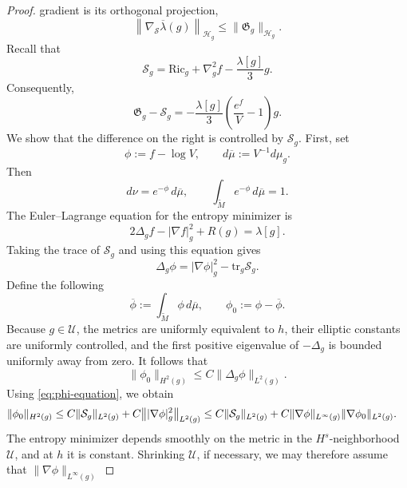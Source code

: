 \documentclass{amsart}
\newcommand{\tr}{\mbox{tr}}
\begin{document}
\begin{proof}
gradient is its orthogonal projection,
\begin{equation}
\label{eq:slice-gradient-projection}
        \left\|
        \nabla_{\mathscr S}\overline\lambda(g)
        \right\|_{\mathcal H_g}
        \leq
        \|\mathfrak G_g\|_{\mathcal H_g}.
\end{equation}
Recall that
\[
        \mathcal S_g
        =
        \text{Ric}_g+\nabla_g^2f
        -
        \frac{\lambda[g]}{3}g.
\]
Consequently,
\begin{equation}
\label{eq:gradient-defect-difference}
        \mathfrak G_g-\mathcal S_g
        =
        -\frac{\lambda[g]}{3}
        \left(
        \frac{e^f}{V}-1
        \right)g.
\end{equation}
We show that the difference on the right is controlled by
\(\mathcal S_g\). First, set
\[
        \phi:=f-\log V,
        \qquad
        d\overline\mu:=V^{-1}d\mu_g.
\]
Then
\[
        d\nu=e^{-\phi}\,d\overline\mu,
        \qquad
        \int_{\widetilde M}e^{-\phi}\,d\overline\mu=1.
\]
The Euler--Lagrange equation for the entropy minimizer is
\[
        2\Delta_gf-|\nabla f|_g^2+R(g)=\lambda[g].
\]
Taking the trace of \(\mathcal S_g\) and using this equation gives
\begin{equation}
\label{eq:phi-equation}
        \Delta_g\phi
        =
        |\nabla\phi|_g^2
        -
        \tr_g\mathcal S_g.
\end{equation}
Define the following
\[
        \overline\phi
        :=
        \int_{\widetilde M}\phi\,d\overline\mu,
        \qquad
        \phi_0:=\phi-\overline\phi.
\]
Because \(g\in\mathcal U\), the metrics are uniformly equivalent to
\(h\), their elliptic constants are uniformly controlled, and the first
positive eigenvalue of \(-\Delta_g\) is bounded uniformly away from zero.
It follows that
\[
        \|\phi_0\|_{H^2(g)}
        \leq
        C\|\Delta_g\phi\|_{L^2(g)}.
\]
Using \eqref{eq:phi-equation}, we obtain
\begin{eqnarray}
        \|\phi_0\|_{H^2(g)}
        &\leq
        C\|\mathcal S_g\|_{L^2(g)}
        +
        C\bigl\||\nabla\phi|_g^2\bigr\|_{L^2(g)}
        \notag\leq
        C\|\mathcal S_g\|_{L^2(g)}
        +
        C\|\nabla\phi\|_{L^\infty(g)}
        \|\nabla\phi_0\|_{L^2(g)}.
\label{eq:phi-H2-preabsorption}
\end{eqnarray}
The entropy minimizer depends smoothly on the metric in the
\(H^s\)-neighborhood \(\mathcal U\), and at \(h\) it is constant.
Shrinking \(\mathcal U\), if necessary, we may therefore assume that
$\|\nabla\phi\|_{L^\infty(g)}$

\end{proof}
\end{document}
